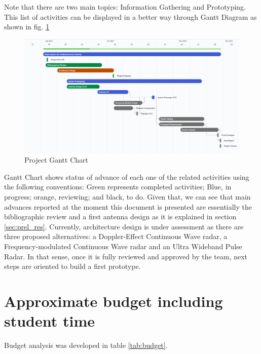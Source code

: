 \documentclass[lettersize,journal]{IEEEtran}
\begin{document}
Note that there are two main topics: Information Gathering and Prototyping. This list of activities can be displayed in a better way through Gantt Diagram as shown in fig. \ref{fig:Gantt}

\begin{figure}[h!]
    \centering
    \includegraphics[scale=0.17]{figs/Gantt.png}
    \caption{Project Gantt Chart}
    \label{fig:Gantt}
\end{figure}
 
Gantt Chart shows status of advance of each one of the related activities using the following conventions: Green represents completed activities; Blue, in progress; orange, reviewing; and black, to do. Given that, we can see that main advances reported at the moment this document is presented are essentially the bibliographic review and a first antenna design as it is explained in section \ref{sec:prel_res}. 
Currently, architecture design is under assessment as there are three proposed alternatives: a Doppler-Effect Continuous Wave radar, a Frequency-modulated Continuous Wave radar and an Ultra Wideband Pulse Radar. In that sense, once it is fully reviewed and approved by the team, next steps are oriented to build a first prototype.


\section{Approximate budget including student time}

Budget analysis was developed in table \ref{tab:budget}.
\end{document}
